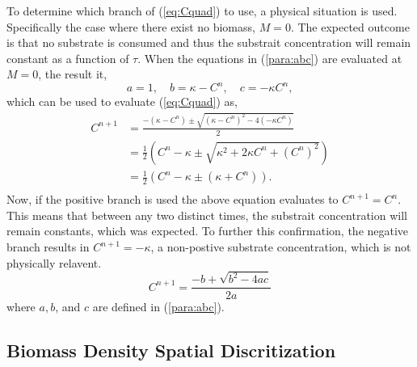   To determine which branch of (\ref{eq:Cquad}) to use, a physical situation is used. 
  Specifically the case where there exist no biomass, $M = 0$. 
  The expected outcome is that no substrate is consumed and thus the substrait concentration will remain constant as a function of $\tau$. 
  When the equations in (\ref{para:abc}) are evaluated at $M = 0$, the result it,
  \begin{equation}
    a = 1, \quad b = \kappa - C^n, \quad c = -\kappa C^n,
  \end{equation} 
  which can be used to evaluate (\ref{eq:Cquad}) as,
  \begin{equation} \begin{aligned}
    C^{n+1} &= \frac{- (\kappa - C^n) \pm \sqrt{(\kappa - C^n)^2 - 4 (-\kappa C^n)}}{2} \\
      &= \frac{1}{2} \left( C^n - \kappa \pm \sqrt{\kappa^2 + 2 \kappa C^n + \left(C^n \right) ^2}\right) \\
      &= \frac{1}{2} \left( C^n - \kappa \pm (\kappa+C^n) \right). \\
  \end{aligned} \end{equation}
  Now, if the positive branch is used the above equation evaluates to $C^{n+1} = C^n$. 
  This means that between any two distinct times, the substrait concentration will remain constants, which was expected. 
  To further this confirmation, the negative branch results in $C^{n+1} = -\kappa $, a non-postive substrate concentration, which is not physically relavent. 
  \begin{equation}
    C^{n+1} = \frac{-b + \sqrt{b^2 - 4ac}}{2a}
  \end{equation} 
  where $a,b$, and $c$ are defined in (\ref{para:abc}).


  \subsection{Biomass Density Spatial Discritization}
  
